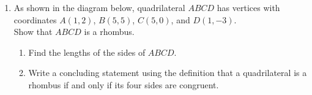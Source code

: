 \documentclass[12pt, twoside]{article}
\begin{document}
\begin{enumerate}
\newpage
\item As shown in the diagram below, quadrilateral $ABCD$ has vertices with coordinates $A(1,2)$, $B(5,5)$, $C(5,0)$, and $D(1,-3)$.\\[0.25cm]
Show that $ABCD$ is a rhombus.
\begin{enumerate}
  \item Find the lengths of the sides of $ABCD$.
    \begin{flushright}
    \end{flushright} \vspace{3cm}
    \item Write a concluding statement using the definition that a quadrilateral is a rhombus if and only if its four sides are congruent.
  \end{enumerate}


\end{enumerate}
\end{document}
